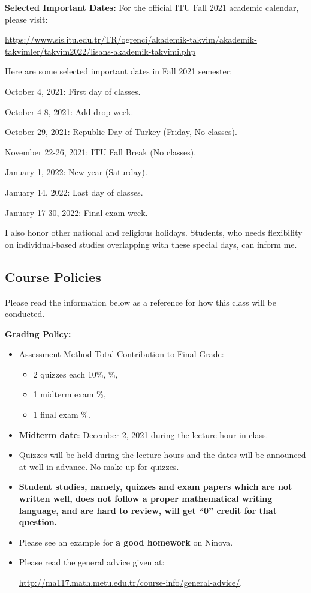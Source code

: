 \documentclass[
  12pt,
]{article}
\providecommand{\tightlist}{%
  \setlength{\itemsep}{0pt}\setlength{\parskip}{0pt}}
\begin{document}
\textbf{Selected Important Dates:} For the official ITU Fall 2021
academic calendar, please visit:

\url{https://www.sis.itu.edu.tr/TR/ogrenci/akademik-takvim/akademik-takvimler/takvim2022/lisans-akademik-takvimi.php}

Here are some selected important dates in Fall 2021 semester:

October 4, 2021: First day of classes.

October 4-8, 2021: Add-drop week.

October 29, 2021: Republic Day of Turkey (Friday, No classes).

November 22-26, 2021: ITU Fall Break (No classes).

January 1, 2022: New year (Saturday).

January 14, 2022: Last day of classes.

January 17-30, 2022: Final exam week.

I also honor other national and religious holidays. Students, who needs
flexibility on individual-based studies overlapping with these special
days, can inform me.

\hypertarget{course-policies}{%
\subsection{Course Policies}\label{course-policies}}

Please read the information below as a reference for how this class will
be conducted.

\textbf{Grading Policy:}

\begin{itemize}
\item
  Assessment Method \quad      \quad \quad                Total
  Contribution to Final Grade:

  \begin{itemize}
  \tightlist
  \item
    2 quizzes each 10\%, \quad \quad {}\%,
  \item
    1 midterm exam \quad \quad {}\%,
  \item
    1 final exam \quad \quad {}\%.
  \end{itemize}
\item
  \textbf{Midterm date}: December 2, 2021 during the lecture hour in
  class.
\item
  Quizzes will be held during the lecture hours and the dates will be
  announced at well in advance. No make-up for quizzes.
\item
  \textbf{Student studies, namely, quizzes and exam papers which are not
  written well, does not follow a proper mathematical writing language,
  and are hard to review, will get ``0'' credit for that question.}
\item
  Please see an example for \textbf{a good homework} on Ninova.
\item
  Please read the general advice given at:

  \url{http://ma117.math.metu.edu.tr/course-info/general-advice/}.
\end{itemize}
\end{document}
